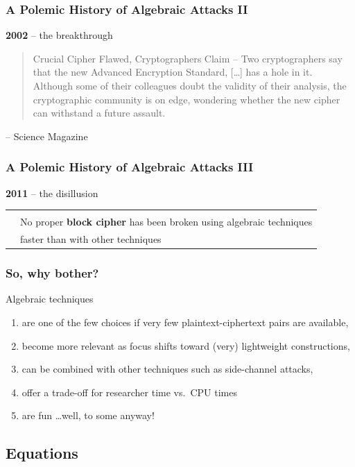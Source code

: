 \documentclass[9pt]{beamer}
\renewcommand{\emph}[1]{\textbf{\color{oxygenorange}#1}\xspace}
\begin{document}
\begin{frame}
\frametitle{A Polemic History of Algebraic Attacks II}

\textbf{2002} -- the breakthrough
\begin{quote}
Crucial Cipher Flawed, Cryptographers Claim -- Two cryptographers say that the new Advanced Encryption Standard, [\dots] has a hole in it. Although some of their colleagues doubt the validity of their analysis, the cryptographic community is on edge, wondering whether the new cipher can withstand a future assault.
\end{quote}
\begin{flushright}
\vspace{-2em}
-- Science Magazine
\end{flushright}

\end{frame}

\begin{frame}
\frametitle{A Polemic History of Algebraic Attacks III}
\textbf{2011} -- the disillusion

\begin{tabular}{ll}
 & \\
\hspace{0.05cm} & No proper \emph{block cipher} has been broken using algebraic techniques\\
 & faster than with other techniques\\
\end{tabular}
\end{frame}

\begin{frame}
\frametitle{So, why bother?}

Algebraic techniques 
\begin{enumerate}
 \item are one of the few choices if very few plaintext-ciphertext pairs are available,
 \item become more relevant as focus shifts toward (very) lightweight constructions,
 \item can be combined with other techniques such as side-channel attacks,
 \item offer a trade-off for researcher time vs.\ CPU times
 \item are fun \dots well, to some anyway!
\end{enumerate}
 
\end{frame}


\subsection{Equations}
\end{document}
